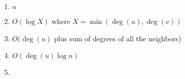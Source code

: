 \documentclass[11pt]{article}
\begin{document}
\begin{enumerate}
    \item $n$
    \item $O(\log{X})$ where $X = \min{(\deg(u), \deg(v))}$
    \item $O(\deg(u)$ plus sum of degrees of all the neighbors)
    \item $O(\deg(u) \log{n})$
    \item 
\end{enumerate}
\end{document}

